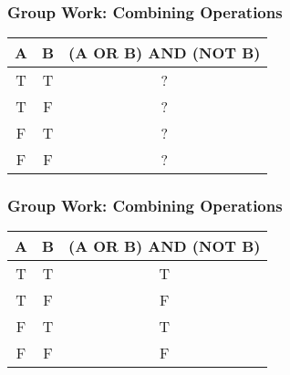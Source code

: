 \documentclass{beamer}
\begin{document}
%
%
\begin{frame}[fragile]
	\frametitle{Group Work: Combining Operations}
	\centering
	\begin{table}[]
		\begin{tabular}{|cc|c|}
			{\color[HTML]{CD9934} \textbf{A}} & {\color[HTML]{3531FF} \textbf{B}} & \textbf{(A OR B) AND (NOT B)} \\ \hline
			{\color[HTML]{CD9934} T}          & {\color[HTML]{3531FF} T}          & ?                             \\
			{\color[HTML]{CD9934} T}          & {\color[HTML]{3531FF} F}          & ?                             \\
			{\color[HTML]{CD9934} F}          & {\color[HTML]{3531FF} T}          & ?                             \\
			{\color[HTML]{CD9934} F}          & {\color[HTML]{3531FF} F}          & ?                           
		\end{tabular}
	\end{table}
\end{frame}

%
%
\begin{frame}[fragile]
	\frametitle{Group Work: Combining Operations}
	\centering
	\begin{table}[]
		\begin{tabular}{|cc|c|}
			{\color[HTML]{CD9934} \textbf{A}} & {\color[HTML]{3531FF} \textbf{B}} & \textbf{(A OR B) AND (NOT B)} \\ \hline
			{\color[HTML]{CD9934} T}          & {\color[HTML]{3531FF} T}          & T                             \\
			{\color[HTML]{CD9934} T}          & {\color[HTML]{3531FF} F}          & F                             \\
			{\color[HTML]{CD9934} F}          & {\color[HTML]{3531FF} T}          & T                             \\
			{\color[HTML]{CD9934} F}          & {\color[HTML]{3531FF} F}          & F                            
		\end{tabular}
	\end{table}
\end{frame}
\end{document}
